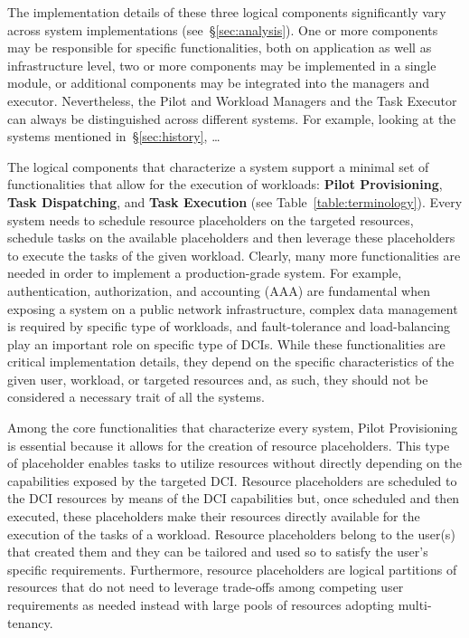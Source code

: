 \documentclass{sig-alternate}
\begin{document}
The implementation details of these three logical components
significantly vary across \pilot system implementations
(see~\S\ref{sec:analysis}). One or more components may be responsible for
specific functionalities, both on application as well as infrastructure
level, two or more components may be implemented in a single module, or
additional components may be integrated into the managers and executor.
Nevertheless, the Pilot and Workload Managers and the Task Executor can
always be distinguished across different \pilot systems. For example,
looking at the systems mentioned in~\S\ref{sec:history}, \ldots
{}

The logical components that characterize a \pilot system support a
minimal set of functionalities that allow for the execution of
workloads: \textbf{Pilot Provisioning}, \textbf{Task Dispatching}, and
\textbf{Task Execution} (see Table~\ref{table:terminology}). Every
\pilot system needs to schedule resource placeholders on the targeted
resources, schedule tasks on the available placeholders and then
leverage these placeholders to execute the tasks of the given workload.
Clearly, many more functionalities are needed in order to implement a
production-grade \pilot system. For example, authentication,
authorization, and accounting (AAA) are fundamental when exposing a
\pilot system on a public network infrastructure, complex data
management is required by specific type of workloads, and
fault-tolerance and load-balancing play an important role on specific
type of DCIs. While these functionalities are critical implementation
details, they depend on the specific characteristics of the given user,
workload, or targeted resources and, as such, they should not be
considered a necessary trait of all the \pilot systems.

Among the core functionalities that characterize every \pilot system,
Pilot Provisioning is essential because it allows for the creation of
resource placeholders. This type of placeholder enables tasks to utilize
resources without directly depending on the capabilities exposed by the
targeted DCI. Resource placeholders are scheduled to the DCI resources
by means of the DCI capabilities but, once scheduled and then executed,
these placeholders make their resources directly available for the
execution of the tasks of a workload. Resource placeholders belong to
the user(s) that created them and they can be tailored and used so to
satisfy the user's specific requirements. Furthermore, resource
placeholders are logical partitions of resources that do not need to
leverage trade-offs among competing user requirements as needed instead
with large pools of resources adopting multi-tenancy.
\end{document}
